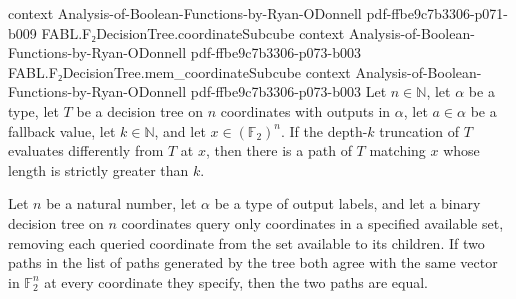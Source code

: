 \begin{theorem}
  {context}
  {Analysis-of-Boolean-Functions-by-Ryan-ODonnell}
  {pdf-ffbe9c7b3306-p071-b009}
\proofstep
  {FABL.F₂DecisionTree.coordinateSubcube}
  {context}
  {Analysis-of-Boolean-Functions-by-Ryan-ODonnell}
  {pdf-ffbe9c7b3306-p073-b003}
\proofstep
  {FABL.F₂DecisionTree.mem_coordinateSubcube}
  {context}
  {Analysis-of-Boolean-Functions-by-Ryan-ODonnell}
  {pdf-ffbe9c7b3306-p073-b003}
Let $n\in\mathbb{N}$, let $\alpha$ be a type, let $T$ be a decision tree on $n$
coordinates with outputs in $\alpha$, let $a\in\alpha$ be a fallback value, let
$k\in\mathbb{N}$, and let $x\in(\mathbb{F}_2)^n$. If the depth-$k$ truncation of $T$
evaluates differently from $T$ at $x$, then there is a path of $T$ matching $x$ whose
length is strictly greater than $k$.
\end{theorem}

\begin{theorem}
\leanok
{}
Let $n$ be a natural number, let $\alpha$ be a type of output labels, and let a binary
decision tree on $n$ coordinates query only coordinates in a specified available set,
removing each queried coordinate from the set available to its children. If two paths in
the list of paths generated by the tree both agree with the same vector in $\mathbb
F_2^n$ at every coordinate they specify, then the two paths are equal.
\end{theorem}

